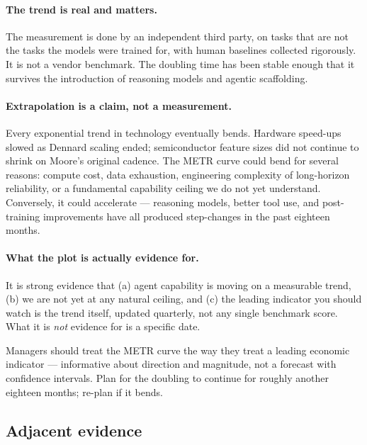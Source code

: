 \documentclass[11pt,a4paper]{article}
\begin{document}
\paragraph{The trend is real and matters.} The measurement is done by
an independent third party, on tasks that are not the tasks the models
were trained for, with human baselines collected rigorously. It is
not a vendor benchmark. The doubling time has been stable enough that
it survives the introduction of reasoning models and agentic
scaffolding.

\paragraph{Extrapolation is a claim, not a measurement.} Every
exponential trend in technology eventually bends. Hardware speed-ups
slowed as Dennard scaling ended; semiconductor feature sizes did not
continue to shrink on Moore's original cadence. The METR curve could
bend for several reasons: compute cost, data exhaustion, engineering
complexity of long-horizon reliability, or a fundamental capability
ceiling we do not yet understand. Conversely, it could accelerate
--- reasoning models, better tool use, and post-training improvements
have all produced step-changes in the past eighteen months.

\paragraph{What the plot is actually evidence for.} It is strong
evidence that (a) agent capability is moving on a measurable trend,
(b) we are not yet at any natural ceiling, and (c) the leading
indicator you should watch is the trend itself, updated quarterly,
not any single benchmark score. What it is \emph{not} evidence for is
a specific date.

\begin{keyinsight}
Managers should treat the METR curve the way they treat a leading
economic indicator --- informative about direction and magnitude, not
a forecast with confidence intervals. Plan for the doubling to
continue for roughly another eighteen months; re-plan if it bends.
\end{keyinsight}

\subsection{Adjacent evidence}
\end{document}
